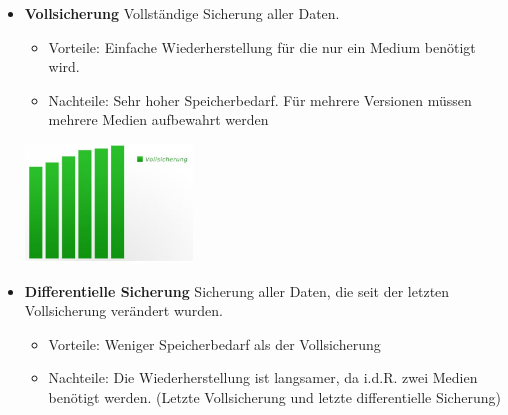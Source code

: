 \documentclass[10pt,a4paper,ragged2e]{altacv}
\begin{document}
\begin{paracol}{2}

\begin{itemize}
\item \textbf{\Large Vollsicherung}
\vspace{3mm}
    \newline Vollständige Sicherung aller Daten.
    \vspace{3mm}
    \begin{itemize}
        \item \large Vorteile:
        \vspace{1mm}
            \newline \textendash \normalsize Einfache Wiederherstellung für die nur ein Medium benötigt wird.
        \vspace{3mm}
        \item \large Nachteile:
        \vspace{1mm}
             \newline \textendash \normalsize Sehr hoher Speicherbedarf.
             \vspace{1mm}
             \newline\textendash \normalsize Für mehrere Versionen müssen mehrere Medien aufbewahrt werden
        
    \end{itemize}
    
    \begin{center}
        \includegraphics[width=0.35\textwidth]{full.png}
    \end{center}
    
    \divider
\item \textbf{\Large Differentielle Sicherung}
\vspace{3mm}
\newline Sicherung aller Daten, die seit der letzten Vollsicherung verändert wurden.
\vspace{3mm}
    \begin{itemize}
        \item \large Vorteile:
        \vspace{1mm}
            \newline \textendash \normalsize Weniger Speicherbedarf als der Vollsicherung
        \vspace{3mm}
        \item \large Nachteile:
        \vspace{1mm}
             \newline \textendash \normalsize Die Wiederherstellung ist langsamer, da i.d.R. zwei Medien benötigt werden. (Letzte Vollsicherung und letzte differentielle Sicherung)
        

\end{itemize}
\end{itemize}
\end{paracol}
\end{document}

